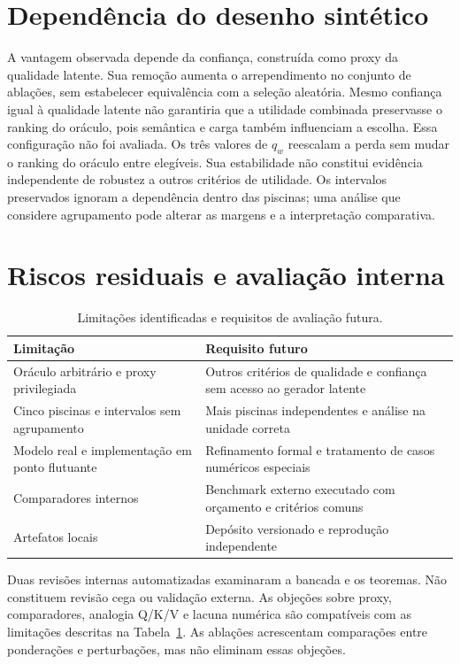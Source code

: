 \documentclass[12pt,openany,oneside,a4paper,brazil,chapter=TITLE]{abntex2}
\begin{document}
\section{Dependência do desenho sintético}
A vantagem observada depende da confiança, construída como proxy da qualidade latente. Sua remoção aumenta o arrependimento no conjunto de ablações, sem estabelecer equivalência com a seleção aleatória. Mesmo confiança igual à qualidade latente não garantiria que a utilidade combinada preservasse o ranking do oráculo, pois semântica e carga também influenciam a escolha. Essa configuração não foi avaliada.
Os três valores de $q_w$ reescalam a perda sem mudar o ranking do oráculo entre elegíveis. Sua estabilidade não constitui evidência independente de robustez a outros critérios de utilidade. Os intervalos preservados ignoram a dependência dentro das piscinas; uma análise que considere agrupamento pode alterar as margens e a interpretação comparativa.
\section{Riscos residuais e avaliação interna}
\begin{table}[htbp]
\fontsize{10}{12}\selectfont\SingleSpacing\centering
\caption{Limitações identificadas e requisitos de avaliação futura.}\label{tab:riscos}
\begin{tabularx}{\textwidth}{XX}\toprule
Limitação & Requisito futuro \\\midrule
Oráculo arbitrário e proxy privilegiada & Outros critérios de qualidade e confiança sem acesso ao gerador latente \\
Cinco piscinas e intervalos sem agrupamento & Mais piscinas independentes e análise na unidade correta \\
Modelo real e implementação em ponto flutuante & Refinamento formal e tratamento de casos numéricos especiais \\
Comparadores internos & Benchmark externo executado com orçamento e critérios comuns \\
Artefatos locais & Depósito versionado e reprodução independente \\
\bottomrule\end{tabularx}
\end{table}
Duas revisões internas automatizadas examinaram a bancada e os teoremas. Não constituem revisão cega ou validação externa. As objeções sobre proxy, comparadores, analogia Q/K/V e lacuna numérica são compatíveis com as limitações descritas na Tabela~\ref{tab:riscos}. As ablações acrescentam comparações entre ponderações e perturbações, mas não eliminam essas objeções.
\end{document}
